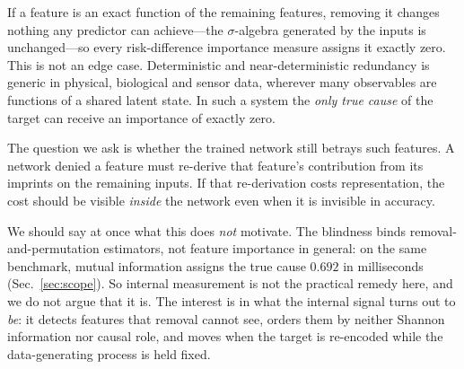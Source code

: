 If a feature is an exact function of the remaining features, removing it changes
nothing any predictor can achieve---the $\sigma$-algebra generated by the inputs
is unchanged---so every risk-difference importance measure assigns it exactly
zero. This is not an edge case. Deterministic and near-deterministic redundancy
is generic in physical, biological and sensor data, wherever many observables
are functions of a shared latent state. In such a system the \emph{only true
cause} of the target can receive an importance of exactly zero.

The question we ask is whether the trained network still betrays such features.
A network denied a feature must re-derive that feature's contribution from its
imprints on the remaining inputs. If that re-derivation costs representation,
the cost should be visible \emph{inside} the network even when it is invisible
in accuracy.

We should say at once what this does \emph{not} motivate. The blindness binds
removal-and-permutation estimators, not feature importance in general: on the
same benchmark, mutual information assigns the true cause $0.692$ in
milliseconds (Sec.~\ref{sec:scope}). So internal measurement is not the
practical remedy here, and we do not argue that it is. The interest is in what
the internal signal turns out to \emph{be}: it detects features that removal
cannot see, orders them by neither Shannon information nor causal role, and
moves when the target is re-encoded while the data-generating process is held
fixed.

